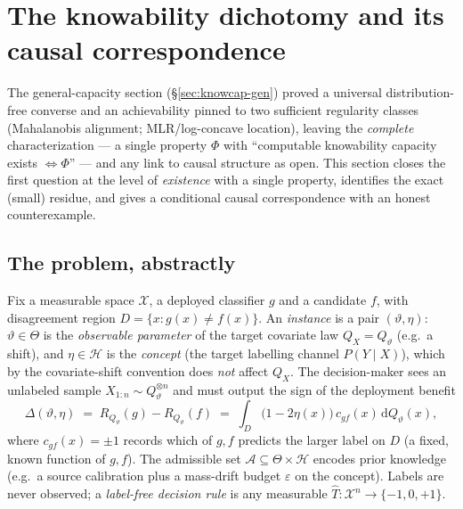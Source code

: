\section{The knowability dichotomy and its causal correspondence}
\label{sec:knowdich}

\providecommand{\TV}{\mathrm{TV}}
\providecommand{\sgn}{\operatorname{sign}}

The general-capacity section (\S\ref{sec:knowcap-gen}) proved a universal
distribution-free converse and an achievability pinned to two sufficient
regularity classes (Mahalanobis alignment; MLR/log-concave location), leaving the
\emph{complete} characterization --- a single property $\Phi$ with
``computable knowability capacity exists $\iff\Phi$'' --- and any link to causal
structure as open. This section closes the first question at the level of
\emph{existence} with a single property, identifies the exact (small) residue, and
gives a conditional causal correspondence with an honest counterexample.

\subsection{The problem, abstractly}\label{sec:dich-abstract}
Fix a measurable space $\mathcal X$, a deployed classifier $g$ and a candidate $f$,
with disagreement region $D=\{x:g(x)\neq f(x)\}$. An \emph{instance} is a pair
$(\vartheta,\eta)$: $\vartheta\in\Theta$ is the \emph{observable parameter} of the
target covariate law $Q_X=Q_\vartheta$ (e.g.\ a shift), and $\eta\in\mathcal H$ is
the \emph{concept} (the target labelling channel $P(Y\mid X)$), which by the
covariate-shift convention does \emph{not} affect $Q_X$. The decision-maker sees an
unlabeled sample $X_{1:n}\sim Q_\vartheta^{\otimes n}$ and must output the sign of
the deployment benefit
\begin{equation}\label{eq:dich-benefit}
  \Delta(\vartheta,\eta)\;=\;R_{Q_\vartheta}(g)-R_{Q_\vartheta}(f)
  \;=\;\int_D \big(1-2\eta(x)\big)\,c_{gf}(x)\,\mathrm dQ_\vartheta(x),
\end{equation}
where $c_{gf}(x)=\pm1$ records which of $g,f$ predicts the larger label on $D$
(a fixed, known function of $g,f$). The admissible set $\mathcal A\subseteq\Theta\times\mathcal H$
encodes prior knowledge (e.g.\ a source calibration plus a mass-drift budget
$\varepsilon$ on the concept). Labels are never observed; a \emph{label-free decision
rule} is any measurable $\hat T:\mathcal X^n\to\{-1,0,+1\}$.

